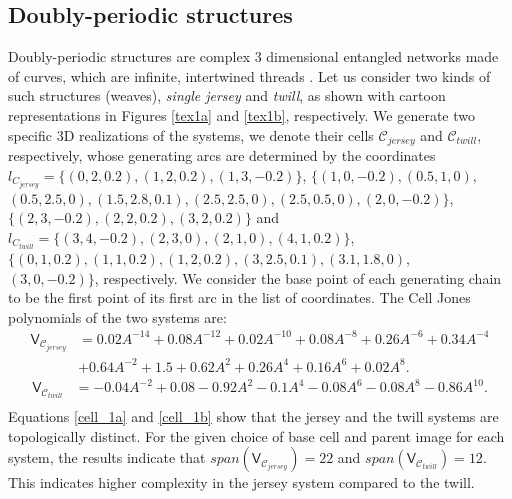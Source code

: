 \documentclass{article}
\begin{document}
\subsection{Doubly-periodic structures}
\label{ex_inf_doubly}
Doubly-periodic structures are complex 3 dimensional entangled networks made of curves, which are infinite, intertwined threads \cite{Fukuda2022,Fukuda2023,Morton2009, Markande2020, Knittel2020, Wadekar2020, Wadekar2021}.  Let us consider two kinds of such structures (weaves), \textit{single jersey} and \textit{twill}, as shown  with cartoon representations in Figures \ref{tex1a} and \ref{tex1b}, respectively. We generate two specific 3D realizations of the systems, we denote their cells $\mathcal{C}_{jersey}$ and $\mathcal{C}_{twill}$, respectively, whose generating arcs are determined by the coordinates $l_{C_{jersey}}=\{(0,2,0.2),(1,2,0.2),(1,3,-0.2)\}$,
$\{(1,0,-0.2),(0.5,1,0),$\\ $(0.5,2.5,0), (1.5,2.8,0.1), (2.5,2.5,0), (2.5,0.5,0),(2,0,-0.2)\}$, 
$\{(2,3,-0.2),(2,2,0.2),(3,2,0.2)\}$ and\\
$l_{C_{twill}}=\{(3,4,-0.2),(2,3,0),(2,1,0),(4,1,0.2)\}$, $\{(0,1,0.2),(1,1,0.2),(1,2,0.2),(3,2.5,0.1),(3.1,1.8,0),$\\$(3,0,-0.2)\}$, 
respectively. We consider the base point of each generating chain to be the first point of its first arc in the list of coordinates. The Cell Jones polynomials of the two systems are:
\begin{equation}
    \begin{split}\displaystyle
     \mathsf{V}_{\mathcal{C}_{jersey}}&=0.02A^{-14}+0.08A^{-12}+0.02A^{-10}+0.08A^{-8}+0.26A^{-6}+0.34A^{-4}\\&+0.64A^{-2}+1.5+0.62A^{2}+0.26A^{4}+0.16A^{6}+0.02A^{8}.
    \end{split}
    \label{cell_1a}
\end{equation}
\begin{equation}
    \begin{split}\displaystyle
    \mathsf{V}_{\mathcal{C}_{twill}}&=-0.04A^{-2}+0.08-0.92A^{2}-0.1A^{4}-0.08A^{6}-0.08A^{8}-0.86A^{10}.\\
    \end{split}
    \label{cell_1b}
\end{equation}
Equations \ref{cell_1a} and \ref{cell_1b} show that the jersey and the twill systems are topologically distinct. For the given choice of base cell and parent image for each system, the results indicate that $span(\mathsf{V}_{\mathcal{C}_{jersey}})=22$ and $span(\mathsf{V}_{\mathcal{C}_{twill}})=12$. This indicates higher complexity in the jersey system compared to the twill. 
\end{document}
